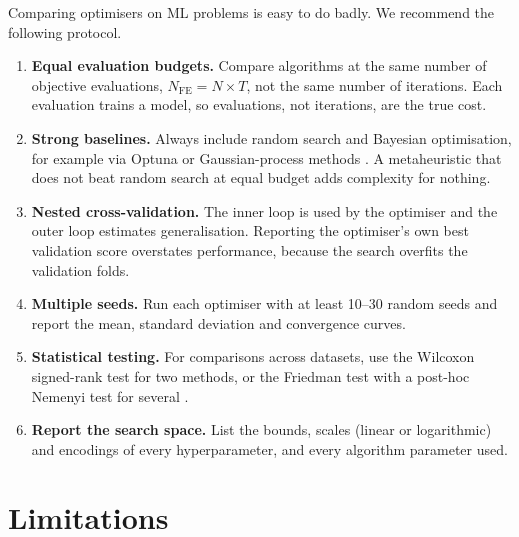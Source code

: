\documentclass[11pt,a4paper]{article}
\begin{document}
Comparing optimisers on ML problems is easy to do badly. We recommend the following protocol.
\begin{enumerate}
  \item \textbf{Equal evaluation budgets.} Compare algorithms at the same number of objective evaluations, $N_{\text{FE}} = N \times T$, not the same number of iterations. Each evaluation trains a model, so evaluations, not iterations, are the true cost.
  \item \textbf{Strong baselines.} Always include random search \citep{bergstra2012} and Bayesian optimisation, for example via Optuna \citep{akiba2019} or Gaussian-process methods \citep{snoek2012}. A metaheuristic that does not beat random search at equal budget adds complexity for nothing.
  \item \textbf{Nested cross-validation.} The inner loop is used by the optimiser and the outer loop estimates generalisation. Reporting the optimiser's own best validation score overstates performance, because the search overfits the validation folds.
  \item \textbf{Multiple seeds.} Run each optimiser with at least 10--30 random seeds and report the mean, standard deviation and convergence curves.
  \item \textbf{Statistical testing.} For comparisons across datasets, use the Wilcoxon signed-rank test for two methods, or the Friedman test with a post-hoc Nemenyi test for several \citep{demsar2006}.
  \item \textbf{Report the search space.} List the bounds, scales (linear or logarithmic) and encodings of every hyperparameter, and every algorithm parameter used.
\end{enumerate}

\section{Limitations}
\label{sec:limitations}
\end{document}
